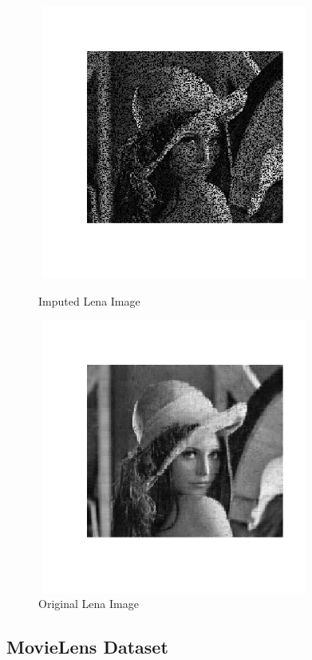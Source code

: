 \documentclass[12pt]{article}
\begin{document}
\begin{figure}
	\centering
	\begin{minipage}[c]{0.49\textwidth}
		\centering
		\includegraphics[angle=0,width=9cm,height=9cm]{lena4}
		\caption{Imputed Lena Image}\label{lena4}
	\end{minipage}
	\begin{minipage}[c]{0.49\textwidth}
		\centering
		\includegraphics[angle=0,width=9cm,height=9cm]{lena5}
		\caption{Original Lena Image}\label{lena5}
	\end{minipage}
\end{figure}

\subsection{MovieLens Dataset}
\end{document}
